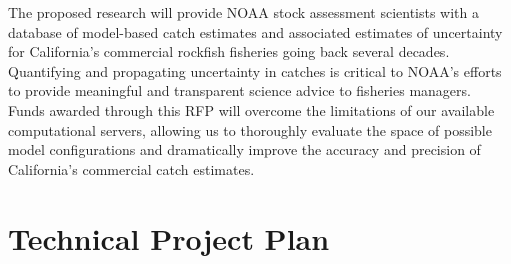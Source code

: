 \documentclass[12pt]{article}
\begin{document}
%
The proposed research will provide NOAA stock assessment scientists with a database of model-based catch estimates and associated estimates of uncertainty for California’s commercial rockfish fisheries going back several decades. 
Quantifying and propagating uncertainty in catches is critical to NOAA’s efforts to provide meaningful and transparent science advice to fisheries managers. 
Funds awarded through this RFP will overcome the limitations of our available computational servers, allowing us to thoroughly evaluate the space of possible model configurations and dramatically improve the accuracy and precision of California’s commercial catch estimates.


%

%
%

%
\section{Technical Project Plan}\label{technical-project-plan}
%
\end{document}
